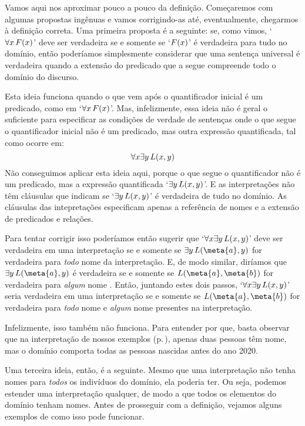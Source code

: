 Vamos aqui nos aproximar pouco a pouco da definição.
Começaremos com algumas propostas ingênuas e vamos corrigindo-as até, eventualmente, chegarmos à definição correta.
Uma primeira proposta é a seguinte:
se, como vimos, `$\forall x\,\mathord{F}(x)$' deve ser verdadeira se e somente se `$\mathord{F}(x)$' é verdadeira para tudo no domínio,
então poderíamos simplesmente considerar que uma sentença universal é verdadeira quando a extensão do predicado que a segue compreende todo o domínio do discurso.

Esta ideia funciona quando o que vem após o quantificador inicial é um predicado, como em  `$\forall x\,\mathord{F}(x)$'.
Mas, infelizmente, essa ideia não é geral o suficiente para especificar as condições de verdade de sentenças onde o que segue o quantificador inicial não é um predicado, mas outra expressão quantificada, tal como ocorre em:
$$\forall x \exists y\,\mathord{L}(x,y)$$
Não conseguimos aplicar esta ideia aqui, porque o que segue o quantificador não é um predicado, mas a expressão quantificada `$\exists y\,\mathord{L}(x,y)$'.
E as interpretações não têm cláusulas que indicam se `$\exists y\,\mathord{L}(x,y)$' é verdadeira de tudo no domínio.
As cláusulas das intepretações especificam apenas a referência de nomes e a extensão de predicados e relações.

Para tentar corrigir isso poderíamos então sugerir que `$\forall x \exists y\, \mathord{L}(x,y)$' deve ser verdadeira em uma interpretação se e somente se $\exists y\, \atom{L}{\meta{a},y}$ for verdadeira para \emph{todo} nome  da interpretação.
E, de modo similar, diríamos que $\exists y\, \atom{L}{\meta{a},y}$ é verdadeira se e somente se $\atom{L}{\meta{a}, \meta{b}}$ for verdadeira para \emph{algum} nome .
Então, juntando estes dois passos, `$\forall x \exists y\, \mathord{L}(x,y)$' seria verdadeira em uma interpretação se e somente se $\atom{L}{\meta{a}, \meta{b}}$ for verdadeira para \emph{todo} nome  e \emph{algum} nome  presentes na interpretação.

Infelizmente, isso também não funciona.
Para entender por que, basta observar que na interpretação de nossos exemplos (p.\,\pageref{i:Sample}), apenas duas pessoas têm nome, mas o domínio comporta todas as pessoas nascidas antes do ano 2020.

Uma terceira ideia, então, é a seguinte.
Mesmo que uma interpretação não tenha nomes para \emph{todos} os indivíduos do domínio, ela poderia ter.
Ou seja, podemos estender uma interpretação qualquer, de modo a que todos os elementos do domínio tenham nomes.
Antes de prosseguir com a definição, vejamos alguns exemplos de como isso pode funcionar.

